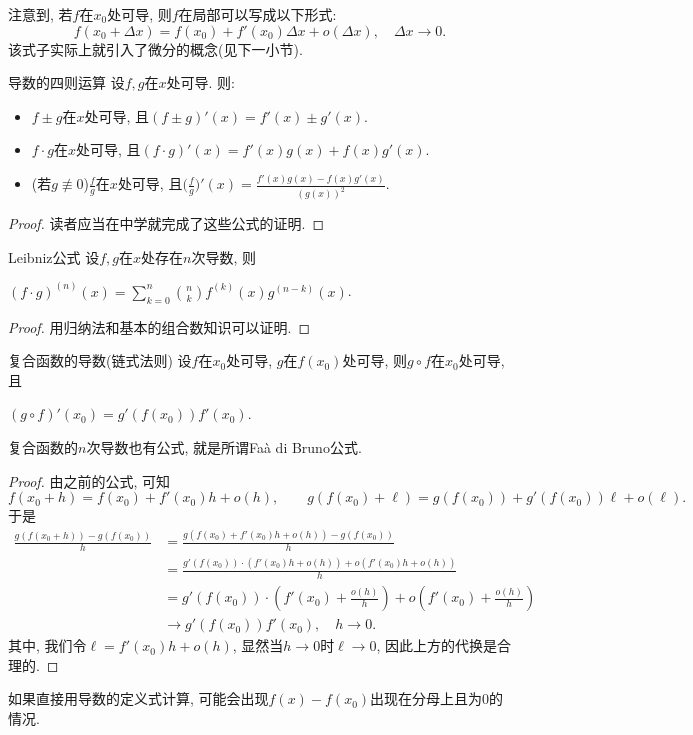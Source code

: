 注意到, 若$f$在$x_0$处可导, 则$f$在局部可以写成以下形式: $$f(x_0+\Delta x) = f(x_0) + f'(x_0) \Delta x + o(\Delta x),\quad \Delta x \to 0. $$
该式子实际上就引入了微分的概念(见下一小节). 

\begin{proposition}{导数的四则运算}
	设$f,g$在$x$处可导. 则: 
	\begin{itemize}
		\item $f \pm g$在$x$处可导, 且$(f \pm g)'(x) = f'(x) \pm g'(x)$. 
		\item $f \cdot g$在$x$处可导, 且$(f\cdot g)'(x)=f'(x)g(x)+f(x)g'(x)$.
		\item (若$g \not\equiv 0$)$\frac{f}{g}$在$x$处可导, 且$\displaystyle \big( \frac{f}{g} \big)'(x) = \frac{f'(x)g(x)-f(x)g'(x)}{(g(x))^2}$. 
	\end{itemize}
\end{proposition}
\begin{proof}
	读者应当在中学就完成了这些公式的证明. 
\end{proof}

\begin{proposition}{Leibniz公式}
	设$f,g$在$x$处存在$n$次导数, 则
	\begin{center}
		$\displaystyle (f \cdot g)^{(n)}(x) = \sum_{k=0}^{n} \binom{n}{k} f^{(k)}(x)g^{(n-k)}(x)$. 
	\end{center}
\end{proposition}
\begin{proof}
	用归纳法和基本的组合数知识可以证明. 
\end{proof}

\begin{theorem}{复合函数的导数(链式法则)}
	设$f$在$x_0$处可导, $g$在$f(x_0)$处可导, 则$g\circ f$在$x_0$处可导, 且
	\begin{center}
		$(g\circ f)'(x_0)=g'(f(x_0))f'(x_0)$. 
	\end{center}
\end{theorem}
\begin{remark}
	复合函数的$n$次导数也有公式, 就是所谓Faà di Bruno公式. 
\end{remark}
\begin{proof}
	由之前的公式, 可知$$f(x_0+h)=f(x_0)+f'(x_0)h+o(h),\qquad g(f(x_0)+\ell )=g(f(x_0))+g'(f(x_0))\ell +o(\ell ).$$
	于是
	\begin{align*}
		\frac{g(f(x_0+h))-g(f(x_0))}{h} &= \frac{g( f(x_0)+f'(x_0)h+o(h) ) - g(f(x_0))}{h} \\
		&= \frac{g'(f(x_0)) \cdot (f'(x_0)h+o(h)) + o(f'(x_0)h+o(h))}{h} \\
		&= g'(f(x_0)) \cdot \left(f'(x_0) + \frac{o(h)}{h} \right) + o\left( f'(x_0)+\frac{o(h)}{h} \right) \\
		&\to g'(f(x_0))f'(x_0),\quad h \to 0. 
	\end{align*}
	其中, 我们令$\ell = f'(x_0)h+o(h)$, 显然当$h\to 0$时$\ell \to 0$, 因此上方的代换是合理的. 
\end{proof}
\begin{remark}
	如果直接用导数的定义式计算, 可能会出现$f(x)-f(x_0)$出现在分母上且为$0$的情况. 
\end{remark}

